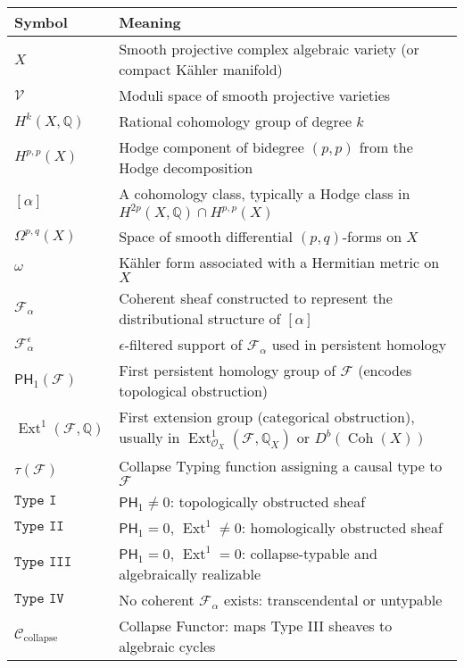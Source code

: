 \documentclass[11pt]{article}
\DeclareMathOperator{\Ext}{Ext}
\begin{document}
\begin{longtable}{|p{3cm}|p{12cm}|}
\hline
\textbf{Symbol} & \textbf{Meaning} \\
\hline \hline
$X$ & Smooth projective complex algebraic variety (or compact Kähler manifold) \\
\hline
$\mathcal{V}$ & Moduli space of smooth projective varieties \\
\hline
$H^{k}(X, \mathbb{Q})$ & Rational cohomology group of degree $k$ \\
\hline
$H^{p,p}(X)$ & Hodge component of bidegree $(p,p)$ from the Hodge decomposition \\
\hline
$[\alpha]$ & A cohomology class, typically a Hodge class in $H^{2p}(X, \mathbb{Q}) \cap H^{p,p}(X)$ \\
\hline
$\Omega^{p,q}(X)$ & Space of smooth differential $(p,q)$-forms on $X$ \\
\hline
$\omega$ & Kähler form associated with a Hermitian metric on $X$ \\
\hline
$\mathcal{F}_\alpha$ & Coherent sheaf constructed to represent the distributional structure of $[\alpha]$ \\
\hline
$\mathcal{F}_\alpha^\epsilon$ & $\epsilon$-filtered support of $\mathcal{F}_\alpha$ used in persistent homology \\
\hline
$\mathsf{PH}_1(\mathcal{F})$ & First persistent homology group of $\mathcal{F}$ (encodes topological obstruction) \\
\hline
$\Ext^1(\mathcal{F}, \mathbb{Q})$ & First extension group (categorical obstruction), usually in $\operatorname{Ext}^1_{\mathcal{O}_X}(\mathcal{F}, \mathbb{Q}_X)$ or $D^b(\operatorname{Coh}(X))$ \\
\hline
$\tau(\mathcal{F})$ & Collapse Typing function assigning a causal type to $\mathcal{F}$ \\
\hline
$\texttt{Type I}$ & $\mathsf{PH}_1 \ne 0$: topologically obstructed sheaf \\
\hline
$\texttt{Type II}$ & $\mathsf{PH}_1 = 0$, $\Ext^1 \ne 0$: homologically obstructed sheaf \\
\hline
$\texttt{Type III}$ & $\mathsf{PH}_1 = 0$, $\Ext^1 = 0$: collapse-typable and algebraically realizable \\
\hline
$\texttt{Type IV}$ & No coherent $\mathcal{F}_\alpha$ exists: transcendental or untypable \\
\hline
$\mathcal{C}_{\text{collapse}}$ & Collapse Functor: maps Type III sheaves to algebraic cycles \\

\end{longtable}
\end{document}
